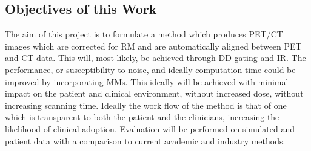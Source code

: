        \subsection{Objectives of this Work} \label{sec:objectives_of_this_work}
            The aim of this project is to formulate a method which produces \gls{PET}/\gls{CT} images which are corrected for \gls{RM} and are automatically aligned between \gls{PET} and \gls{CT} data. This will, most likely, be achieved through \gls{DD} gating and \gls{IR}. The performance, or susceptibility to noise, and ideally computation time could be improved by incorporating \gls{MM}s. This ideally will be achieved with minimal impact on the patient and clinical environment, without increased dose, without increasing scanning time. Ideally the work flow of the method is that of one which is transparent to both the patient and the clinicians, increasing the likelihood of clinical adoption. Evaluation will be performed on simulated and patient data with a comparison to current academic and industry methods.
    
